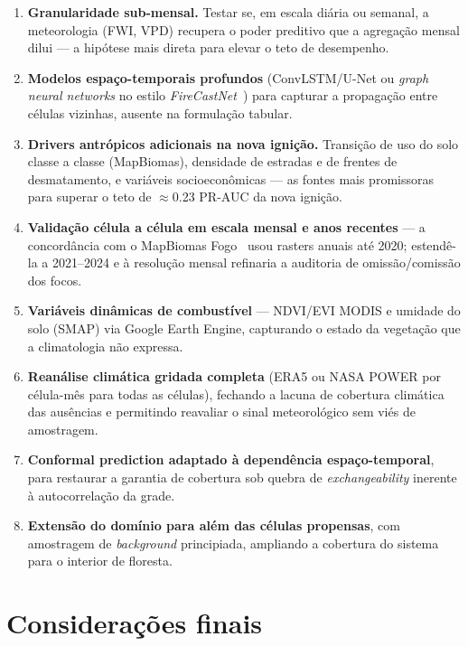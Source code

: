 \documentclass[tcc2]{uftex}
\begin{document}
\begin{enumerate}
  \item \textbf{Granularidade sub-mensal.} Testar se, em escala diária ou semanal, a meteorologia (FWI, VPD) recupera o poder preditivo que a agregação mensal dilui --- a hipótese mais direta para elevar o teto de desempenho.

  \item \textbf{Modelos espaço-temporais profundos} (ConvLSTM/U-Net ou \emph{graph neural networks} no estilo \emph{FireCastNet}~\cite{karasante2025firecastnet}) para capturar a propagação entre células vizinhas, ausente na formulação tabular.

  \item \textbf{Drivers antrópicos adicionais na nova ignição.} Transição de uso do solo classe a classe (MapBiomas), densidade de estradas e de frentes de desmatamento, e variáveis socioeconômicas --- as fontes mais promissoras para superar o teto de \(\approx\)\num{0,23} PR-AUC da nova ignição.

  \item \textbf{Validação célula a célula em escala mensal e anos recentes} --- a concordância com o MapBiomas Fogo~\cite{mapbiomasfogo} usou rasters anuais até 2020; estendê-la a 2021--2024 e à resolução mensal refinaria a auditoria de omissão/comissão dos focos.

  \item \textbf{Variáveis dinâmicas de combustível} --- NDVI/EVI MODIS e umidade do solo (SMAP) via Google Earth Engine, capturando o estado da vegetação que a climatologia não expressa.

  \item \textbf{Reanálise climática gridada completa} (ERA5 ou NASA POWER por célula-mês para todas as células), fechando a lacuna de cobertura climática das ausências e permitindo reavaliar o sinal meteorológico sem viés de amostragem.

  \item \textbf{Conformal prediction adaptado à dependência espaço-temporal}, para restaurar a garantia de cobertura sob quebra de \emph{exchangeability} inerente à autocorrelação da grade.

  \item \textbf{Extensão do domínio para além das células propensas}, com amostragem de \emph{background} principiada, ampliando a cobertura do sistema para o interior de floresta.
\end{enumerate}

\section{Considerações finais}
\label{sec:conclusao_consideracoes}
\end{document}
